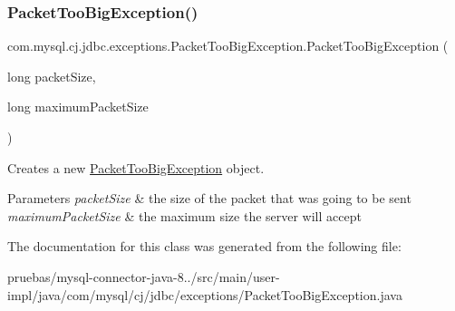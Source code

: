 \subsubsection{\texorpdfstring{Packet\+Too\+Big\+Exception()}{PacketTooBigException()}}
{\footnotesize\ttfamily com.\+mysql.\+cj.\+jdbc.\+exceptions.\+Packet\+Too\+Big\+Exception.\+Packet\+Too\+Big\+Exception (\begin{DoxyParamCaption}\item[{long}]{packet\+Size,  }\item[{long}]{maximum\+Packet\+Size }\end{DoxyParamCaption})}

Creates a new \mbox{\hyperlink{classcom_1_1mysql_1_1cj_1_1jdbc_1_1exceptions_1_1_packet_too_big_exception}{Packet\+Too\+Big\+Exception}} object.


\begin{DoxyParams}{Parameters}
{\em packet\+Size} & the size of the packet that was going to be sent \\
\hline
{\em maximum\+Packet\+Size} & the maximum size the server will accept \\
\hline
\end{DoxyParams}


The documentation for this class was generated from the following file\+:\begin{DoxyCompactItemize}
\item 
pruebas/mysql-\/connector-\/java-\/8../src/main/user-\/impl/java/com/mysql/cj/jdbc/exceptions/Packet\+Too\+Big\+Exception.\+java\end{DoxyCompactItemize}
